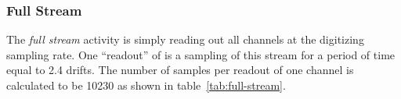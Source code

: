 \begin{table}[htbf]
  \centering
  \caption{Rate estimations of hypothetically isolated sources of activity in
    the DUNE far detector.
  The ``???'' indicate input needed is still needed.}
  \label{tab:rate-summary}
\end{table}

\subsubsection{Full Stream}

The \textit{full stream} activity is simply reading out all channels
at the digitizing sampling rate.
One ``readout'' of is a sampling of this stream for a period of time
equal to 2.4 drifts.
The number of samples per readout of one channel is calculated to be
10230 as shown in table~\ref{tab:full-stream}.

